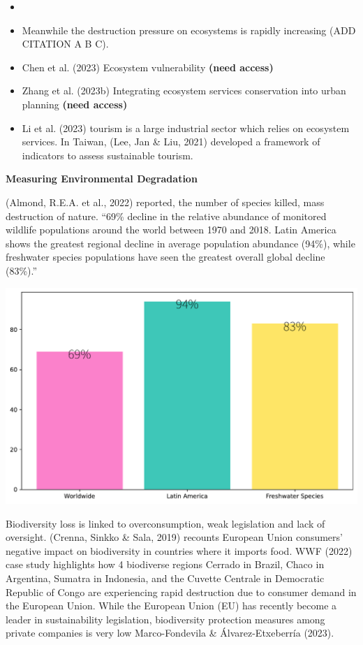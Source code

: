 \documentclass[
  letterpaper,
  DIV=11,
  numbers=noendperiod]{scrartcl}
\begin{document}
\begin{itemize}
\item
\item
  Meanwhile the destruction pressure on ecosystems is rapidly increasing
  (ADD CITATION A B C).
\item
  Chen et al. (2023) Ecosystem vulnerability \textbf{(need access)}
\item
  Zhang et al. (2023b) Integrating ecosystem services conservation into
  urban planning \textbf{(need access)}
\item
  Li et al. (2023) tourism is a large industrial sector which relies on
  ecosystem services. In Taiwan, (Lee, Jan \& Liu, 2021) developed a
  framework of indicators to assess sustainable tourism.
\end{itemize}

\textbf{Measuring Environmental Degradation}

(Almond, R.E.A. et al., 2022) reported, the number of species killed,
mass destruction of nature. ``69\% decline in the relative abundance of
monitored wildlife populations around the world between 1970 and 2018.
Latin America shows the greatest regional decline in average population
abundance (94\%), while freshwater species populations have seen the
greatest overall global decline (83\%).''

\includegraphics{_thesis_files/figure-pdf/cell-14-output-1.pdf}

Biodiversity loss is linked to overconsumption, weak legislation and
lack of oversight. (Crenna, Sinkko \& Sala, 2019) recounts European
Union consumers' negative impact on biodiversity in countries where it
imports food. WWF (2022) case study highlights how 4 biodiverse regions
Cerrado in Brazil, Chaco in Argentina, Sumatra in Indonesia, and the
Cuvette Centrale in Democratic Republic of Congo are experiencing rapid
destruction due to consumer demand in the European Union. While the
European Union (EU) has recently become a leader in sustainability
legislation, biodiversity protection measures among private companies is
very low Marco-Fondevila \& Álvarez-Etxeberría (2023).
\end{document}
